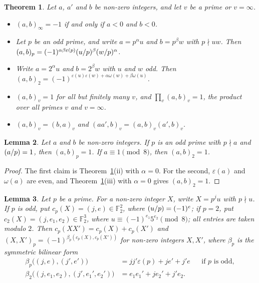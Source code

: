 \documentclass[11pt]{article}
\newtheorem{theorem}{Theorem}
\newtheorem{lemma}[theorem]{Lemma}
\newcommand{\F}{\mathbb{F}}
\newcommand{\leg}[2]{\mathchoice{\biggl(\dfrac{#1}{#2}\biggr)}{(#1/#2)}{(#1/#2)}{(#1/#2)}}
\begin{document}
\begin{theorem}\label{thm:hilbert}
Let $a$, $a'$ and $b$ be non-zero integers, and let $v$ be a prime or $v=\infty$.
\begin{itemize}
\item[(i)] $(a,b)_\infty=-1$ if and only if $a<0$ and $b<0$.
\item[(ii)] Let $p$ be an odd prime, and write $a=p^\alpha u$ and $b=p^\beta w$ with $p\nmid uw$. Then $(a,b)_p=(-1)^{\alpha\beta\varepsilon(p)}\leg{u}{p}^\beta\leg{w}{p}^\alpha$.
\item[(iii)] Write $a=2^\alpha u$ and $b=2^\beta w$ with $u$ and $w$ odd. Then $(a,b)_2=(-1)^{\varepsilon(u)\varepsilon(w)+\alpha\omega(w)+\beta\omega(u)}$.
\item[(iv)] $(a,b)_v=1$ for all but finitely many $v$, and $\prod_v(a,b)_v=1$, the product over all primes $v$ and $v=\infty$.
\item[(v)] $(a,b)_v=(b,a)_v$ and $(aa',b)_v=(a,b)_v(a',b)_v$.
\end{itemize}
\end{theorem}

\begin{lemma}\label{lem:square}
Let $a$ and $b$ be non-zero integers. If $p$ is an odd prime with $p\nmid a$ and $\leg{a}{p}=1$, then $(a,b)_p=1$. If $a\equiv1\pmod8$, then $(a,b)_2=1$.
\end{lemma}

\begin{proof}
The first claim is Theorem~\ref{thm:hilbert}(ii) with $\alpha=0$. For the second, $\varepsilon(a)$ and $\omega(a)$ are even, and Theorem~\ref{thm:hilbert}(iii) with $\alpha=0$ gives $(a,b)_2=1$.
\end{proof}


\begin{lemma}\label{lem:classes}
Let $p$ be a prime. For a non-zero integer $X$, write $X=p^ju$ with $p\nmid u$. If $p$ is odd, put $c_p(X)=(j,e)\in\F_2^2$, where $\leg{u}{p}=(-1)^e$; if $p=2$, put $c_2(X)=(j,e_1,e_2)\in\F_2^3$, where $u\equiv(-1)^{e_1}5^{e_2}\pmod8$; all entries are taken modulo $2$. Then $c_p(XX')=c_p(X)+c_p(X')$ and $(X,X')_p=(-1)^{\beta_p(c_p(X),c_p(X'))}$ for non-zero integers $X,X'$, where $\beta_p$ is the symmetric bilinear form
\begin{align*}
\beta_p\bigl((j,e),(j',e')\bigr)&=jj'\varepsilon(p)+je'+j'e&&\text{if $p$ is odd},\\
\beta_2\bigl((j,e_1,e_2),(j',e_1',e_2')\bigr)&=e_1e_1'+je_2'+j'e_2.
\end{align*}
\end{lemma}
\end{document}
